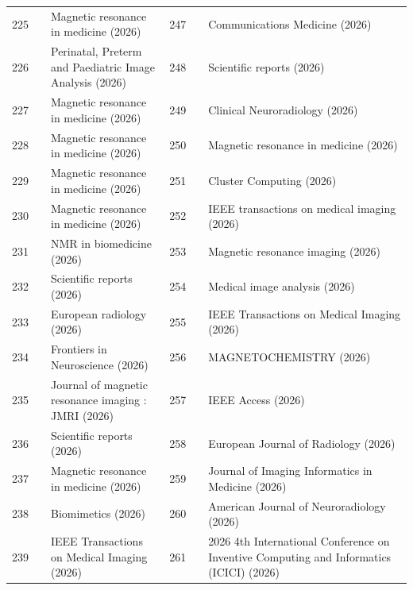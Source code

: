\documentclass[11pt]{article}
\begin{document}
{\begin{longtable}{r l p{} r l p{}}
225 & \cite{schauman2026an} & Magnetic resonance in medicine (2026) & 247 & \cite{f2026simulationbased} & Communications Medicine (2026) \\
226 & \cite{thomas2026automatic} & Perinatal, Preterm and Paediatric Image Analysis (2026) & 248 & \cite{islam2026synpoc} & Scientific reports (2026) \\
227 & \cite{liu2026blockinterleaved} & Magnetic resonance in medicine (2026) & 249 & \cite{sebastian2026ultrafast} & Clinical Neuroradiology (2026) \\
228 & \cite{lee2026cartesian} & Magnetic resonance in medicine (2026) & 250 & \cite{kim2026vessel} & Magnetic resonance in medicine (2026) \\
229 & \cite{okell2026combined} & Magnetic resonance in medicine (2026) & 251 & \cite{salem2026bald} & Cluster Computing (2026) \\
230 & \cite{marchetto2026contrastoptimized} & Magnetic resonance in medicine (2026) & 252 & \cite{starck2026diff} & IEEE transactions on medical imaging (2026) \\
231 & \cite{beljaards2026deepdisorder} & NMR in biomedicine (2026) & 253 & \cite{saeed2026improved} & Magnetic resonance imaging (2026) \\
232 & \cite{yoshida2026deep} & Scientific reports (2026) & 254 & \cite{liang2026itermask} & Medical image analysis (2026) \\
233 & \cite{baz2026deep} & European radiology (2026) & 255 & \cite{mirza2026learning} & IEEE Transactions on Medical Imaging (2026) \\
234 & \cite{s2026evaluating} & Frontiers in Neuroscience (2026) & 256 & \cite{seonghyeon2026simulation} & MAGNETOCHEMISTRY (2026) \\
235 & \cite{ho2026evaluation} & Journal of magnetic resonance imaging : JMRI (2026) & 257 & \cite{tessema2026technical} & IEEE Access (2026) \\
236 & \cite{mello2026fast} & Scientific reports (2026) & 258 & \cite{xia2026accurate} & European Journal of Radiology (2026) \\
237 & \cite{li2026fewshot} & Magnetic resonance in medicine (2026) & 259 & \cite{solak2026braingan} & Journal of Imaging Informatics in Medicine (2026) \\
238 & \cite{b2026ganbased} & Biomimetics (2026) & 260 & \cite{tabari2026clinical} & American Journal of Neuroradiology (2026) \\
239 & \cite{liu2026highly} & IEEE Transactions on Medical Imaging (2026) & 261 & \cite{jayadeepthi2026deep} & 2026 4th International Conference on Inventive Computing and Informatics (ICICI) (2026) \\

\end{longtable}}
\end{document}
